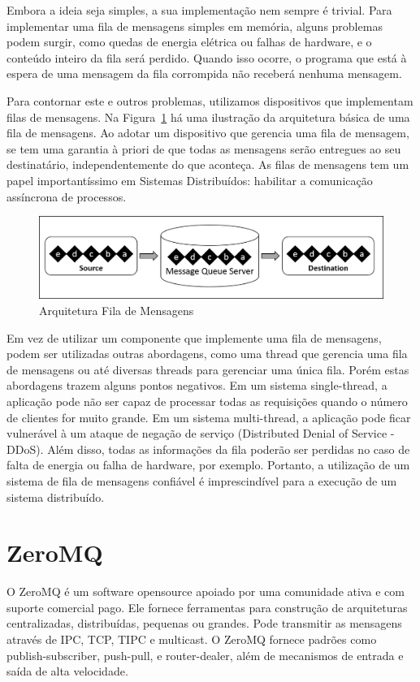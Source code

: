 \documentclass[12pt]{article}
\begin{document}
	Embora a ideia seja simples, a sua implementação nem sempre é trivial. Para implementar uma fila de mensagens simples em memória, alguns problemas podem surgir, como quedas de energia elétrica ou falhas de hardware, e o conteúdo inteiro da fila será perdido. Quando isso ocorre, o programa que está à espera de uma mensagem da fila corrompida não receberá nenhuma mensagem.

	Para contornar este e outros problemas, utilizamos dispositivos que implementam filas de mensagens. Na Figura~\ref{fig:fig_msgqueue} há uma ilustração da arquitetura básica de uma fila de mensagens. Ao adotar um dispositivo que gerencia uma fila de mensagem, se tem uma garantia à priori de que todas as mensagens serão entregues ao seu destinatário, independentemente do que aconteça. As filas de mensagens tem um papel importantíssimo em Sistemas Distribuídos: habilitar a comunicação assíncrona de processos.

\begin{figure}[ht]
\centering
	\includegraphics[width=.85\textwidth]{Img_MsgQueue.png}
\caption{Arquitetura Fila de Mensagens}
\label{fig:fig_msgqueue}
\end{figure}

	Em vez de utilizar um componente que implemente uma fila de mensagens, podem ser utilizadas outras abordagens, como uma thread que gerencia uma fila de mensagens ou até diversas threads para gerenciar uma única fila. Porém estas abordagens trazem alguns pontos negativos. Em um sistema single-thread, a aplicação pode não ser capaz de processar todas as requisições quando o número de clientes for muito grande. Em um sistema multi-thread, a aplicação pode ficar vulnerável à um ataque de negação de serviço (Distributed Denial of Service - DDoS). Além disso, todas as informações da fila poderão ser perdidas no caso de falta de energia ou falha de  hardware, por exemplo. Portanto, a utilização de um sistema de fila de mensagens confiável é imprescindível para a execução de um sistema distribuído.

\section{ZeroMQ} \label{sec:firstpage}
	O ZeroMQ é um software opensource apoiado por uma comunidade ativa e com suporte comercial pago. Ele fornece ferramentas para construção de arquiteturas centralizadas, distribuídas, pequenas ou grandes. Pode transmitir as mensagens através de IPC, TCP, TIPC e multicast. O ZeroMQ fornece padrões como publish-subscriber, push-pull, e router-dealer, além de mecanismos de entrada e saída de alta velocidade.
\end{document}
